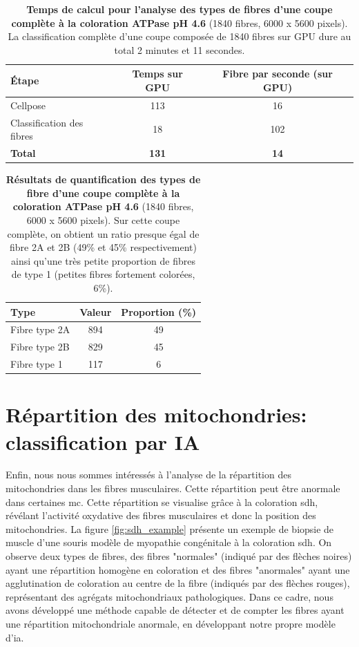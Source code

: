 \begin{table}[!ht]
\centering
\caption[Temps de calcul pour l'analyse des types de fibres d'une coupe complète ATPase]{\textbf{Temps de calcul pour l'analyse des types de fibres d'une coupe complète à la coloration ATPase pH 4.6} (1840 fibres, 6000 x 5600 pixels). La classification complète d'une coupe composée de 1840 fibres sur GPU dure au total 2 minutes et 11 secondes.}
\label{tab:atp_wsi_timetable}
\begin{tabular}{|l|c|c|}
\hline
\textbf{Étape} & \textbf{Temps sur GPU} & \textbf{Fibre par seconde (sur GPU)} \\
\hline
Cellpose & 113 & 16 \\
\hline
Classification des fibres & 18 & 102 \\
\hline
\textbf{Total} & \textbf{131} & \textbf{14} \\
\hline
\end{tabular}
\end{table}
\begin{table}[!ht]
\centering
\caption[Résultats de quantification des types de fibre d'une coupe complète ATPase]{\textbf{Résultats de quantification des types de fibre d'une coupe complète à la coloration ATPase pH 4.6} (1840 fibres, 6000 x 5600 pixels). Sur cette coupe complète, on obtient un ratio presque égal de fibre 2A et 2B (49\% et 45\% respectivement) ainsi qu'une très petite proportion de fibres de type 1 (petites fibres fortement colorées, 6\%).}
\label{tab:atp_wsi_resultstable}
\begin{tabular}{|l|c|c|}
\hline
\textbf{Type} & \textbf{Valeur} & \textbf{Proportion (\%)} \\
\hline
Fibre type 2A & 894 & 49 \\
\hline
Fibre type 2B & 829 & 45 \\
\hline
Fibre type 1 & 117 & 6 \\
\hline
\end{tabular}
\end{table}


\section{Répartition des mitochondries: classification par IA}
Enfin, nous nous sommes intéressés à l'analyse de la répartition des mitochondries dans les fibres musculaires. Cette répartition peut être anormale dans certaines \gls{mc}. Cette répartition se visualise grâce à la coloration \gls{sdh}, révélant l'activité oxydative des fibres musculaires et donc la position des mitochondries. La figure \ref{fig:sdh_example} présente un exemple de biopsie de muscle d'une souris modèle de myopathie congénitale à la coloration \gls{sdh}. On observe deux types de fibres, des fibres "normales" (indiqué par des flèches noires) ayant une répartition homogène en coloration et des fibres "anormales" ayant une agglutination de coloration au centre de la fibre (indiqués par des flèches rouges), représentant des agrégats mitochondriaux pathologiques. Dans ce cadre, nous avons développé une méthode capable de détecter et de compter les fibres ayant une répartition mitochondriale anormale, en développant notre propre modèle d'\gls{ia}.

